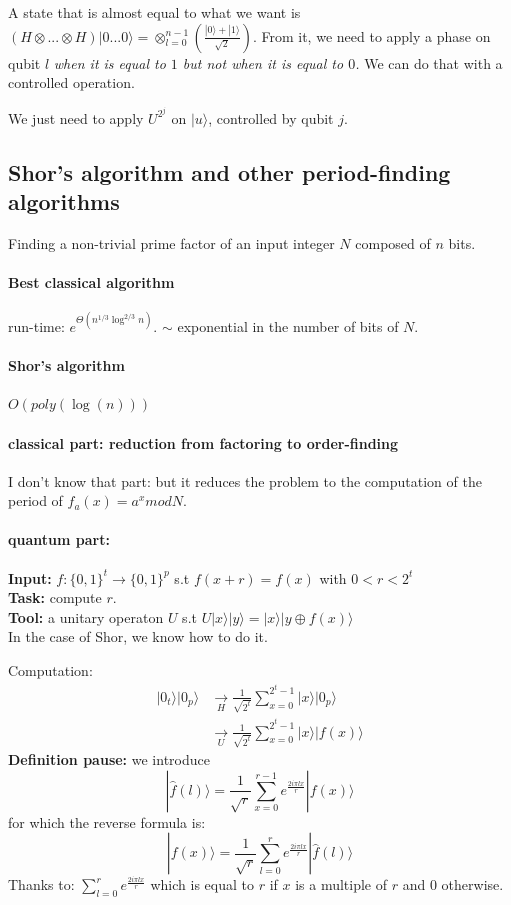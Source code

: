 \documentclass{article}
\begin{document}
A state that is almost equal to what we want is $\left(H\otimes ... \otimes H\right) |0...0\rangle = \otimes_{l=0}^{n-1} \left(\frac{|0\rangle+|1\rangle}{\sqrt{2}}\right)$. From it, we need to apply a phase on qubit $l$ \emph{when it is equal to $1$ but not when it is equal to $0$.} We can do that with a controlled operation.

We just need to apply $U^{2^j}$ on $|u\rangle$, controlled by qubit $j$.

\subsection{Shor's algorithm and other period-finding algorithms}

Finding a non-trivial prime factor of an input integer $N$ composed 
of $n$ bits. 

\paragraph{Best classical algorithm} run-time: 
$e^{\Theta(n^{1/3}\log^{2/3} n)}$. $\sim$ exponential in the number of bits of $N$.

\paragraph{Shor's algorithm} $O(poly(\log(n)))$

\paragraph{classical part: reduction from factoring to order-finding}
I don't know that part: but it reduces the problem to the computation
of the period of $f_a(x)=a^x mod N$.

\paragraph{quantum part: }
\textbf{Input:} $f:\{0,1\}^{t}\rightarrow \{0,1\}^{p}$ s.t
$f(x+r)=f(x)$ with $0<r<2^t$\\
\textbf{Task:} compute $r$.\\
\textbf{Tool:} a unitary operaton $U$ s.t $U|x\rangle|y\rangle = |x\rangle
|y\oplus f(x)\rangle$\\
In the case of Shor, we know how to do it.

Computation:
\begin{align*}
    |0_t\rangle|0_p\rangle &\xrightarrow[H]{} \frac{1}{\sqrt{2^t}} \sum_{x=0}^{2^t-1} |x\rangle|0_p\rangle \\
    &\xrightarrow[U]{} \frac{1}{\sqrt{2^t}}\sum_{x=0}^{2^t-1} |x\rangle|f(x)\rangle
\end{align*}
\textbf{Definition pause: } we introduce $$|\hat{f}(l)\rangle = \frac{1}{\sqrt{r}} \sum_{x=0}^{r-1} e^{\frac{2i\pi l x}{r}} |f(x)\rangle $$
for which the reverse formula is:
$$|f(x)\rangle = \frac{1}{\sqrt{r}} \sum_{l=0}^{r} e^{\frac{2i\pi lx}{r}} |\hat{f}(l)\rangle  $$
Thanks to: 
$\sum_{l=0}^{r} e^{\frac{2i\pi l x}{r}}$ which is equal to $r$ if $x$ is a multiple of $r$ and $0$ otherwise.
\end{document}
